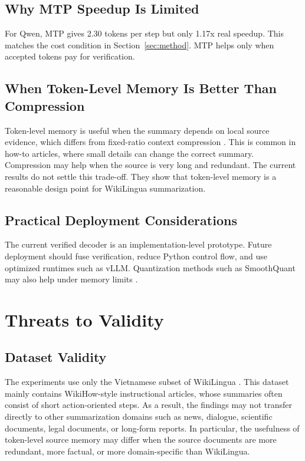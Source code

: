 \documentclass[11pt]{article}
\begin{document}
\subsection{Why MTP Speedup Is Limited}

For Qwen, MTP gives 2.30 tokens per step but only 1.17x real speedup.
This matches the cost condition in Section~\ref{sec:method}.
MTP helps only when accepted tokens pay for verification.

\subsection{When Token-Level Memory Is Better Than Compression}

Token-level memory is useful when the summary depends on local source evidence, which differs from fixed-ratio context compression \citep{li2026contextcompression}.
This is common in how-to articles, where small details can change the correct summary.
Compression may help when the source is very long and redundant.
The current results do not settle this trade-off.
They show that token-level memory is a reasonable design point for WikiLingua summarization.

\subsection{Practical Deployment Considerations}

The current verified decoder is an implementation-level prototype.
Future deployment should fuse verification, reduce Python control flow, and use optimized runtimes such as vLLM.
Quantization methods such as SmoothQuant may also help under memory limits \citep{xiao2023smoothquant}.

\section{Threats to Validity}
\label{sec:validity}

\subsection{Dataset Validity}

The experiments use only the Vietnamese subset of WikiLingua \citep{ladhak2020wikilingua}.
This dataset mainly contains WikiHow-style instructional articles, whose summaries often consist of short action-oriented steps.
As a result, the findings may not transfer directly to other summarization domains such as news, dialogue, scientific documents, legal documents, or long-form reports.
In particular, the usefulness of token-level source memory may differ when the source documents are more redundant, more factual, or more domain-specific than WikiLingua.
\end{document}
